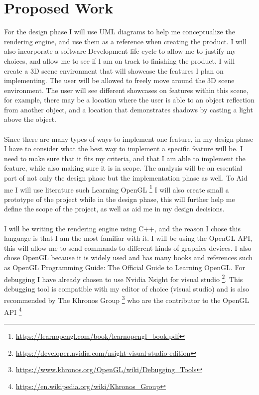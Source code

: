 \documentclass[]{article}
\begin{document}
\section{Proposed Work}
For the design phase I will use UML diagrams to help me conceptualize the rendering engine, and use them as a reference when creating the product. I will also incorporate a software Development life cycle to allow me to justify my choices, and allow me to see if I am on track to finishing the product.
I will create a 3D scene environment that will showcase the features I plan on implementing. The user will be allowed to freely move around the 3D scene environment. The user will see different showcases on features within this scene, for example, there may be a location where the user is able to an object reflection from another object, and a location that demonstrates shadows by casting a light above the object.
\\\\
Since there are many types of ways to implement one feature, in my design phase I have to consider what the best way to implement a specific feature will be. I need to make sure that it fits my criteria, and that I am able to implement the feature, while also making sure it is in scope. The analysis will be an essential part of not only the design phase but the implementation phase as well.
To Aid me I will use literature such Learning OpenGL \footnote{\url{https://learnopengl.com/book/learnopengl_book.pdf}}
I will also create small a prototype of the project while in the design phase, this will further help me define the scope of the project, as well as aid me in my design decisions.
\\\\
I will be writing the rendering engine using C++, and the reason I chose this language is that I am the most familiar with it. I will be using the OpenGL API, this will allow me to send commands to different kinds of graphics devices\cite{designengine}. I also chose OpenGL because it is widely used and has many books and references such as OpenGL Programming Guide: The Official Guide to Learning OpenGL\cite{opengl30}. 
For debugging I have already chosen to use Nvidia Nsight for visual studio \footnote{\url{https://developer.nvidia.com/nsight-visual-studio-edition}}. This debugging tool is compatible with my editor of choice (visual studio) and is also recommended by The Khronos Group \footnote{\url{https://www.khronos.org/OpenGL/wiki/Debugging_Tools}} who are the contributor to the OpenGL API \footnote{\url{https://en.wikipedia.org/wiki/Khronos_Group}}
\end{document}
